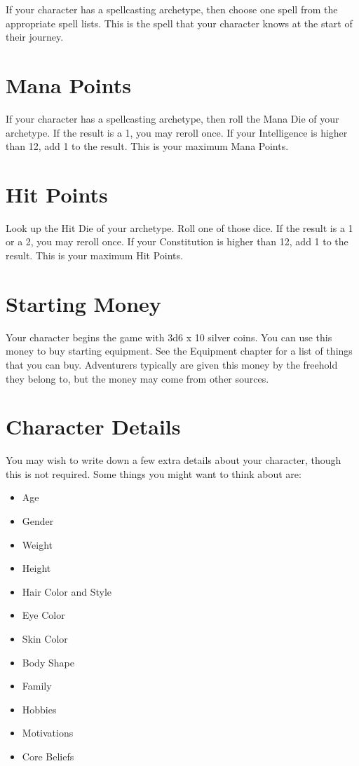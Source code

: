 \begin{multicols}{2}
If your character has a spellcasting archetype, then choose one spell from the
appropriate spell lists. This is the spell that your character knows at
the start of their journey.

\section{Mana Points}

If your character has a spellcasting archetype, then roll the Mana Die of your
archetype. If the result is a 1, you may reroll once. If your Intelligence
is higher than 12, add 1 to the result. This is your maximum Mana Points.

\section{Hit Points}

Look up the Hit Die of your archetype. Roll one of those dice. If the result is a
1 or a 2, you may reroll once. If your Constitution is higher than 12, add 1
to the result. This is your maximum Hit Points.

\section{Starting Money}

Your character begins the game with 3d6 x 10 silver coins. You can use this
money to buy starting equipment. See the Equipment chapter for a list of
things that you can buy. Adventurers typically are given this money by the
freehold they belong to, but the money may come from other sources.

\section{Character Details}

You may wish to write down a few extra details about your character, though
this is not required. Some things you might want to think about are:

\begin{itemize}
	\item Age
	\item Gender
	\item Weight
	\item Height
	\item Hair Color and Style
	\item Eye Color
	\item Skin Color
	\item Body Shape
	\item Family
	\item Hobbies
	\item Motivations
	\item Core Beliefs
\end{itemize}


\end{multicols}
